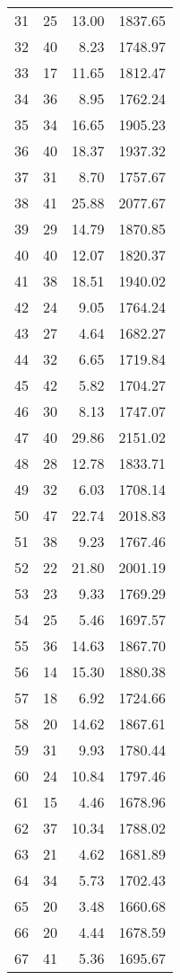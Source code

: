 \begin{appendix}
\begin{longtable}{rrrr}
31 & 25 & 13.00 & 1837.65 \\
32 & 40 & 8.23 & 1748.97 \\
33 & 17 & 11.65 & 1812.47 \\
34 & 36 & 8.95 & 1762.24 \\
35 & 34 & 16.65 & 1905.23 \\
36 & 40 & 18.37 & 1937.32 \\
37 & 31 & 8.70 & 1757.67 \\
38 & 41 & 25.88 & 2077.67 \\
39 & 29 & 14.79 & 1870.85 \\
40 & 40 & 12.07 & 1820.37 \\
41 & 38 & 18.51 & 1940.02 \\
42 & 24 & 9.05 & 1764.24 \\
43 & 27 & 4.64 & 1682.27 \\
44 & 32 & 6.65 & 1719.84 \\
45 & 42 & 5.82 & 1704.27 \\
46 & 30 & 8.13 & 1747.07 \\
47 & 40 & 29.86 & 2151.02 \\
48 & 28 & 12.78 & 1833.71 \\
49 & 32 & 6.03 & 1708.14 \\
50 & 47 & 22.74 & 2018.83 \\
51 & 38 & 9.23 & 1767.46 \\
52 & 22 & 21.80 & 2001.19 \\
53 & 23 & 9.33 & 1769.29 \\
54 & 25 & 5.46 & 1697.57 \\
55 & 36 & 14.63 & 1867.70 \\
56 & 14 & 15.30 & 1880.38 \\
57 & 18 & 6.92 & 1724.66 \\
58 & 20 & 14.62 & 1867.61 \\
59 & 31 & 9.93 & 1780.44 \\
60 & 24 & 10.84 & 1797.46 \\
61 & 15 & 4.46 & 1678.96 \\
62 & 37 & 10.34 & 1788.02 \\
63 & 21 & 4.62 & 1681.89 \\
64 & 34 & 5.73 & 1702.43 \\
65 & 20 & 3.48 & 1660.68 \\
66 & 20 & 4.44 & 1678.59 \\
67 & 41 & 5.36 & 1695.67 \\
\bottomrule
\end{longtable}


\end{appendix}
